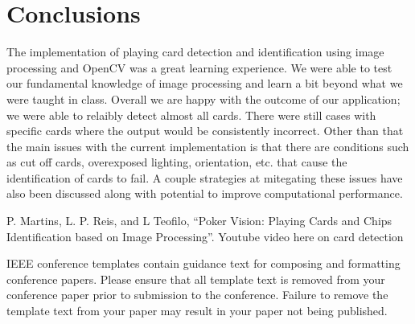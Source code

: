 \documentclass[conference]{IEEEtran}
\begin{document}
\section{Conclusions}
The implementation of playing card detection and identification using image processing and OpenCV
was a great learning experience. We were able to test our fundamental knowledge of image processing
and learn a bit beyond what we were taught in class. Overall we are happy with the outcome of our
application; we were able to relaibly detect almost all cards. There were still cases with specific
cards where the output would be consistently incorrect. Other than that the main issues with the
current implementation is that there are conditions such as cut off cards, overexposed lighting,
orientation, etc. that cause the identification of cards to fail. A couple strategies at mitegating
these issues have also been discussed along with potential to improve computational performance.

\begin{thebibliography}{00}
 P. Martins, L. P. Reis, and L Teofilo, ``Poker Vision: Playing Cards and
    Chips Identification based on Image Processing''.
 Youtube video here on card detection
\end{thebibliography}
\vspace{12pt}
\color{red}
IEEE conference templates contain guidance text for composing and formatting conference papers. Please ensure that all template text is removed from your conference paper prior to submission to the conference. Failure to remove the template text from your paper may result in your paper not being published.
\end{document}

